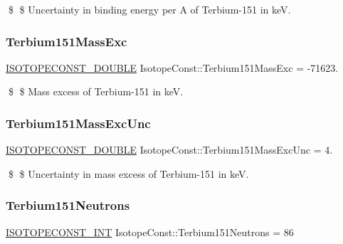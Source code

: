 \$ \$ Uncertainty in binding energy per A of Terbium-\/151 in keV. \mbox{\label{group___isotope_const-_terbium-_tb151_ga4b09206bcddcd815f5763b371868f1a6}} 
\subsubsection{\texorpdfstring{Terbium151\+Mass\+Exc}{Terbium151MassExc}}
{\footnotesize\ttfamily \mbox{\hyperlink{group___isotope_const-_macros_ga8f45a7272ce02c0b4c65c44636ed719a}{I\+S\+O\+T\+O\+P\+E\+C\+O\+N\+S\+T\+\_\+\+D\+O\+U\+B\+LE}} Isotope\+Const\+::\+Terbium151\+Mass\+Exc = -\/71623.}

\$ \$ Mass excess of Terbium-\/151 in keV. \mbox{\label{group___isotope_const-_terbium-_tb151_ga839051389a3449ba71e7ec9b31168f3d}} 
\subsubsection{\texorpdfstring{Terbium151\+Mass\+Exc\+Unc}{Terbium151MassExcUnc}}
{\footnotesize\ttfamily \mbox{\hyperlink{group___isotope_const-_macros_ga8f45a7272ce02c0b4c65c44636ed719a}{I\+S\+O\+T\+O\+P\+E\+C\+O\+N\+S\+T\+\_\+\+D\+O\+U\+B\+LE}} Isotope\+Const\+::\+Terbium151\+Mass\+Exc\+Unc = 4.}

\$ \$ Uncertainty in mass excess of Terbium-\/151 in keV. \mbox{\label{group___isotope_const-_terbium-_tb151_ga7ed3b43afc5e3ffc744f70fa6ffbd98b}} 
\subsubsection{\texorpdfstring{Terbium151\+Neutrons}{Terbium151Neutrons}}
{\footnotesize\ttfamily \mbox{\hyperlink{group___isotope_const-_macros_ga5f18360b3e99483a35c32d789e62621c}{I\+S\+O\+T\+O\+P\+E\+C\+O\+N\+S\+T\+\_\+\+I\+NT}} Isotope\+Const\+::\+Terbium151\+Neutrons = 86}

